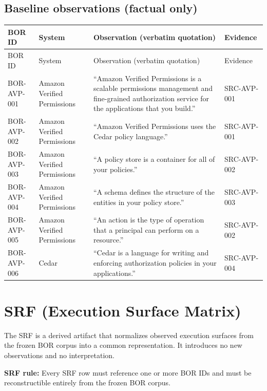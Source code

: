 \documentclass{article}
\begin{document}
\subsection*{Baseline observations (factual only)}
\begin{longtable}{@{}p{}p{}p{}p{}@{}}
\toprule
BOR ID & System & Observation (verbatim quotation) & Evidence\\
\midrule
\endfirsthead
\toprule
BOR ID & System & Observation (verbatim quotation) & Evidence\\
\midrule
\endhead
BOR-AVP-001 & Amazon Verified Permissions & ``Amazon Verified Permissions is a scalable permissions management and fine-grained authorization service for the applications that you build.'' & SRC-AVP-001\\
BOR-AVP-002 & Amazon Verified Permissions & ``Amazon Verified Permissions uses the Cedar policy language.'' & SRC-AVP-001\\
BOR-AVP-003 & Amazon Verified Permissions & ``A policy store is a container for all of your policies.'' & SRC-AVP-002\\
BOR-AVP-004 & Amazon Verified Permissions & ``A schema defines the structure of the entities in your policy store.'' & SRC-AVP-003\\
BOR-AVP-005 & Amazon Verified Permissions & ``An action is the type of operation that a principal can perform on a resource.'' & SRC-AVP-002\\
BOR-AVP-006 & Cedar & ``Cedar is a language for writing and enforcing authorization policies in your applications.'' & SRC-AVP-004\\
\bottomrule
\end{longtable}

\newpage
\section*{SRF (Execution Surface Matrix)}

The SRF is a derived artifact that normalizes observed execution surfaces from the frozen BOR corpus into a common representation. It introduces no new observations and no interpretation.

\noindent\textbf{SRF rule:} Every SRF row must reference one or more BOR IDs and must be reconstructible entirely from the frozen BOR corpus.
\end{document}
